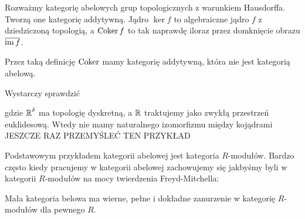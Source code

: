 \begin{example}
  \item Rozważmy kategorię abelowych grup topologicznych z warunkiem Hausdorffa. Tworzą one kategorię addytywną. Jądro $\ker f$ to algebraiczne jądro $f$ z dziedziczoną topologią, a $\operatorname{Coker} f$ to tak naprawdę iloraz przez domknięcie obrazu $\overline{\operatorname{im} f}$.

  \begin{center}\end{center}

  Przez taką definicję $\operatorname{Coker}$ mamy kategorię addytywną, która nie jest kategorią abelową.

  Wystarczy sprawdzić
  \begin{center}\end{center}
  gdzie $\operatorname{\mathbb{R}}^\delta$ ma topologię dyskretną, a $\operatorname{\mathbb{R}}$ traktujemy jako zwykłą przestrzeń euklidesową. Wtedy nie mamy naturalnego izomorfizmu między kojądrami {\large\color{red}JESZCZE RAZ PRZEMYŚLEĆ TEN PRZYKŁAD}

\item Podstawowym przykładem kategorii abelowej jest kategoria $R$-modułów. Bardzo często kiedy pracujemy w kategorii abelowej zachowujemy się jakbyśmy byli w kategorii $R$-modułów na mocy twierdzenia Freyd-Mitchella:

  \begin{dygresja}
    Mała kategoria belowa ma wierne, pełne i dokładne zanurzenie w kategorię $R$-modułów dla pewnego $R$.
  \end{dygresja}
\end{example}

